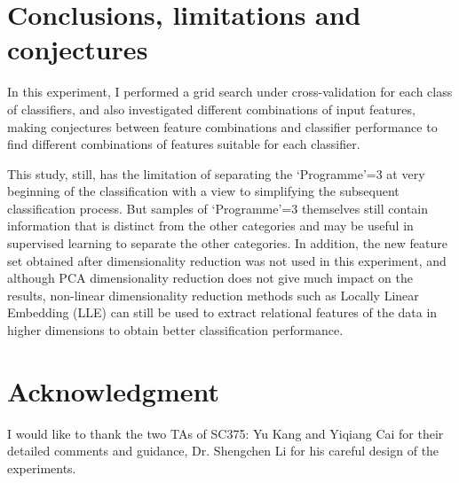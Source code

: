 \documentclass[journal]{IEEEtai}
\begin{document}
\section{\textbf{Conclusions, limitations and conjectures}}
In this experiment, I performed a grid search under cross-validation for each class of classifiers, and also investigated different combinations of input features, making conjectures between feature combinations and classifier performance to find different combinations of features suitable for each classifier. 

This study, still, has the limitation of separating the `Programme'=3 at very beginning of the classification with a view to simplifying the subsequent classification process. But samples of `Programme'=3 themselves still contain information that is distinct from the other categories and may be useful in supervised learning to separate the other categories. In addition, the new feature set obtained after dimensionality reduction was not used in this experiment, and although PCA dimensionality reduction does not give much impact on the results, non-linear dimensionality reduction methods such as Locally Linear Embedding (LLE) can still be used to extract relational features of the data in higher dimensions to obtain better classification performance.

\section{\textbf{Acknowledgment}}
I would like to thank the two TAs of SC375: Yu Kang and Yiqiang Cai for their detailed comments and guidance, Dr. Shengchen Li for his careful design of the experiments.
\end{document}
